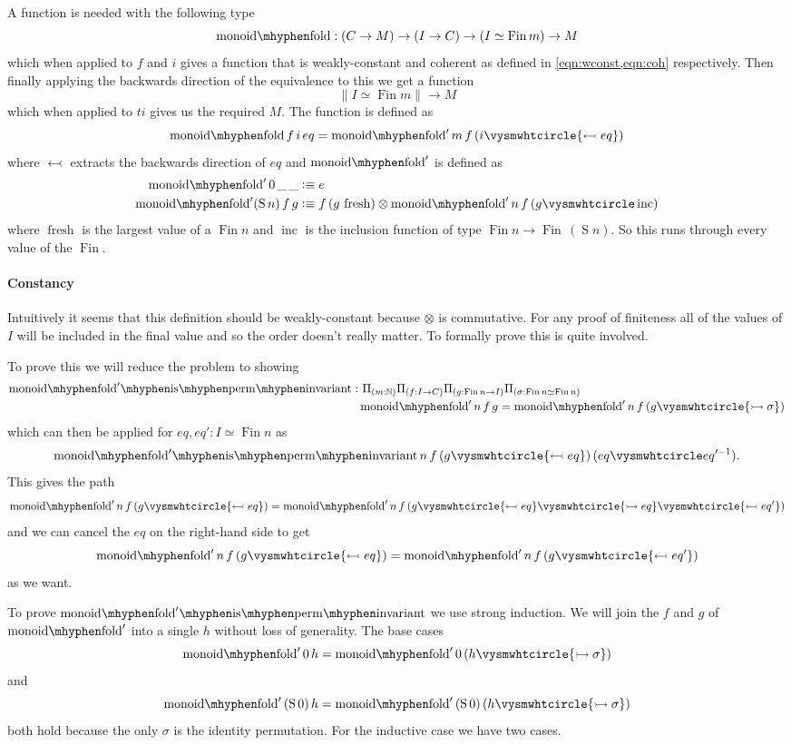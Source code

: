 \documentclass[12pt, parskip, DIV=14]{scrbook}
\newcommand{\defeq}{\vcentcolon\equiv}
\renewcommand{\circ}{\vysmwhtcircle}
\newcommand{\Fin}{\operatorname{Fin}}
\newcommand{\Suc}{\operatorname{S}}
\newcommand{\monfold}{\operatorname{monoid\mhyphen fold}}
\newcommand{\monfoldinv}{\operatorname{monoid\mhyphen fold}'\mkern-3mu\operatorname{\mhyphen is\mhyphen perm\mhyphen invariant}}
\newcommand{\fresh}{\operatorname{fresh}}
\newcommand{\inc}{\operatorname{inc}}
\begin{document}
A function is needed with the following type
$$\monfold : (C \to M) \to (I \to C) \to (I \simeq \Fin m) \to M$$
which when applied to $f$ and $i$ gives a function that is weakly-constant and coherent as defined in \cref{eqn:wconst,eqn:coh} respectively. Then finally applying the backwards direction of the equivalence to this we get a function $$\| I \simeq \Fin m\| \to M$$ which when applied to $ti$ gives us the required $M$. The function is defined as
$$\monfold f\,i\,eq = \monfold' m\,f \,(i \circ {\leftarrowtail eq})$$
 where $\leftarrowtail$ extracts the backwards direction of $eq$ and $\monfold'$ is defined as
\begin{align*}
  \monfold' 0\,\_\,\_ &\defeq e \\
  \monfold' (\Suc n)\,f\,g &\defeq f\,(g\,\fresh) \otimes \monfold' n\,f\,(g \circ \inc)
\end{align*}
where $\fresh$ is the largest value of a $\Fin n$ and $\inc$ is the inclusion function of type $\Fin n \to \Fin\,(\Suc n)$. So this runs through every value of the $\Fin$.

\paragraph{Constancy} Intuitively it seems that this definition should be weakly-constant because $\otimes$ is commutative. For any proof of finiteness all of the values of $I$ will be included in the final value and so the order doesn't really matter. To formally prove this is quite involved.

To prove this we will reduce the problem to showing
\begin{align*}
  \monfoldinv : &~\Pi_{(m : \mathbb{N})}\Pi_{(f : I \to C)}\Pi_{(g : \Fin n \to I)}\Pi_{(\sigma : \Fin n \simeq \Fin n)} \\
  & \monfold' n\,f\,g = \monfold' n\,f\,(g \circ {\rightarrowtail \sigma})
\end{align*}
which can then be applied for $eq , eq' : I \simeq \Fin n$ as
$$\monfoldinv n\,f\,(g \circ {\leftarrowtail eq})\,(eq \circ eq'^{-1}).$$
This gives the path
$$\monfold' n\,f\,(g \circ {\leftarrowtail eq}) = \monfold' n\,f\,(g \circ {\leftarrowtail eq} \circ {\rightarrowtail eq} \circ {\leftarrowtail eq'})$$
and we can cancel the $eq$ on the right-hand side to get
$$\monfold' n\,f\,(g \circ {\leftarrowtail eq}) = \monfold' n\,f\,(g \circ {\leftarrowtail eq'})$$
as we want.

To prove $\monfoldinv$ we use strong induction. We will join the $f$ and $g$ of $\monfold'$ into a single $h$ without loss of generality. The base cases
$$\monfold' 0\,h = \monfold' 0\,(h \circ {\rightarrowtail \sigma})$$
and
$$\monfold'\,(\Suc 0)\,h = \monfold'\,(\Suc 0)\,(h \circ {\rightarrowtail \sigma})$$
both hold because the only $\sigma$ is the identity permutation. For the inductive case we have two cases.
\end{document}
